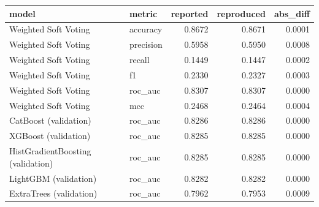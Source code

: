 \begin{tabular}{llrrr}
\toprule
model & metric & reported & reproduced & abs\_diff \\
\midrule
Weighted Soft Voting & accuracy & 0.8672 & 0.8671 & 0.0001 \\
Weighted Soft Voting & precision & 0.5958 & 0.5950 & 0.0008 \\
Weighted Soft Voting & recall & 0.1449 & 0.1447 & 0.0002 \\
Weighted Soft Voting & f1 & 0.2330 & 0.2327 & 0.0003 \\
Weighted Soft Voting & roc\_auc & 0.8307 & 0.8307 & 0.0000 \\
Weighted Soft Voting & mcc & 0.2468 & 0.2464 & 0.0004 \\
CatBoost (validation) & roc\_auc & 0.8286 & 0.8286 & 0.0000 \\
XGBoost (validation) & roc\_auc & 0.8285 & 0.8285 & 0.0000 \\
HistGradientBoosting (validation) & roc\_auc & 0.8285 & 0.8285 & 0.0000 \\
LightGBM (validation) & roc\_auc & 0.8282 & 0.8282 & 0.0000 \\
ExtraTrees (validation) & roc\_auc & 0.7962 & 0.7953 & 0.0009 \\
\bottomrule
\end{tabular}
